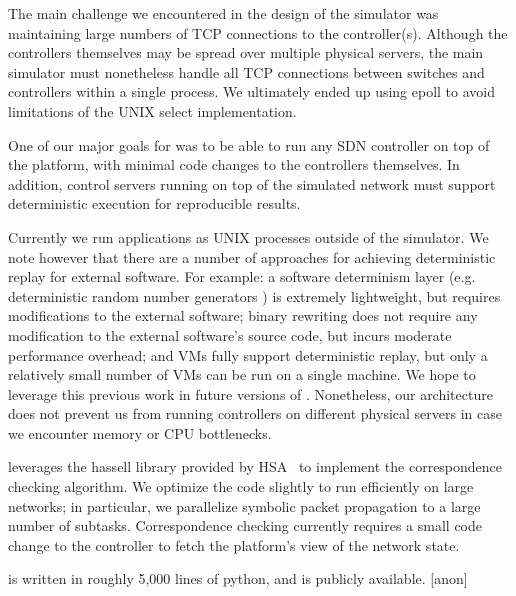 The main challenge we encountered in the design of the simulator was
maintaining large numbers of TCP connections to the
controller(s). Although the controllers themselves may be spread
over multiple physical servers, the main simulator must nonetheless handle all
TCP connections between switches and controllers within a single process.
We ultimately ended up using epoll to avoid limitations of the UNIX select
implementation.

 One of our major goals for \projectname{}
was to be able to run any SDN controller on top of the platform, with minimal
code changes to the controllers themselves. In addition, control servers
running on top of the simulated network must support deterministic execution
for reproducible results.

Currently we run applications as UNIX processes outside of the simulator.
We note however that there are a number of approaches for achieving deterministic
replay for external software. For example: a software determinism layer (e.g.
deterministic random number generators ) is
extremely lightweight, but requires modifications to the external software;
binary rewriting does not require any modification to the external
software's source code, but incurs moderate performance overhead; and VMs
fully support deterministic replay, but only a relatively small number of VMs can be run
on a single machine. We hope to leverage this previous work in future versions
of \projectname{}. Nonetheless, our architecture does not prevent us from
running controllers on different physical
servers in case we encounter memory or CPU bottlenecks.

\projectname{} leverages the hassell library provided by HSA~\cite{hsa}
to implement the correspondence checking algorithm. We optimize the code
slightly to run efficiently on large networks; in particular, we parallelize
symbolic packet propagation to a large number of subtasks. Correspondence
checking currently requires a small code change to the controller to fetch
the platform's view of the network state.

\projectname{} is written in roughly 5,000 lines of python, and is publicly
available. [anon]
